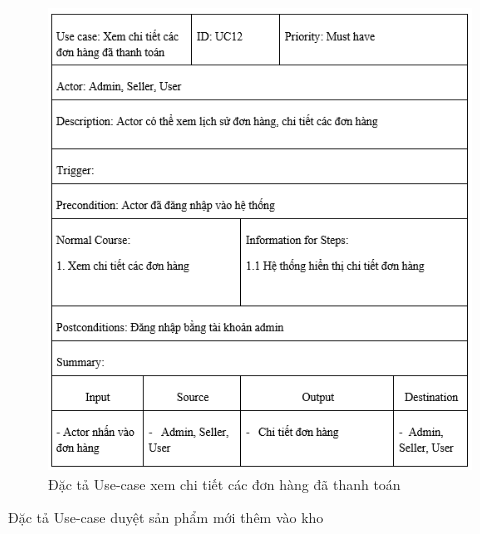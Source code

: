 \documentclass{article}
\begin{document}
{{{{{{{{{{{{	\begin{center}
		\begin{figure}[htp]
			\begin{center}
				\includegraphics[scale=.950]{anh22.png}
			\end{center}
			\caption{Đặc tả Use-case xem chi tiết các đơn hàng đã thanh toán }
			
		\end{figure}
	\end{center}
\newpage
{\large Đặc tả Use-case duyệt sản phẩm mới thêm vào kho
	
}}}}}}}}}}}}}
\end{document}

